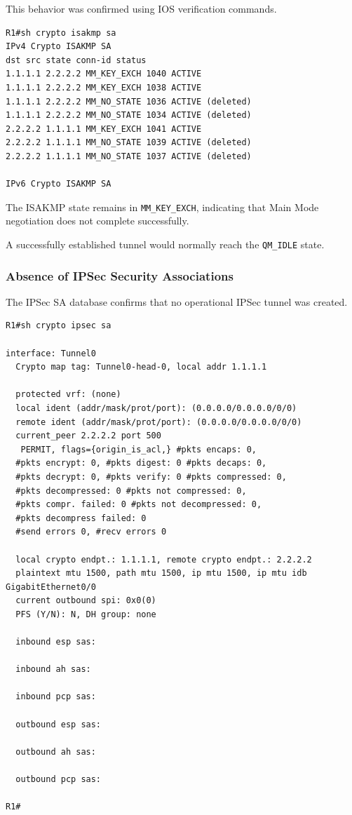 \documentclass[12pt]{article}
\begin{document}
This behavior was confirmed using IOS verification commands.

\begin{verbatim}
R1#sh crypto isakmp sa 
IPv4 Crypto ISAKMP SA 
dst src state conn-id status 
1.1.1.1 2.2.2.2 MM_KEY_EXCH 1040 ACTIVE 
1.1.1.1 2.2.2.2 MM_KEY_EXCH 1038 ACTIVE 
1.1.1.1 2.2.2.2 MM_NO_STATE 1036 ACTIVE (deleted) 
1.1.1.1 2.2.2.2 MM_NO_STATE 1034 ACTIVE (deleted) 
2.2.2.2 1.1.1.1 MM_KEY_EXCH 1041 ACTIVE 
2.2.2.2 1.1.1.1 MM_NO_STATE 1039 ACTIVE (deleted) 
2.2.2.2 1.1.1.1 MM_NO_STATE 1037 ACTIVE (deleted) 

IPv6 Crypto ISAKMP SA
\end{verbatim}

The ISAKMP state remains in \texttt{MM\_KEY\_EXCH}, indicating that Main Mode negotiation does not complete successfully.

A successfully established tunnel would normally reach the \texttt{QM\_IDLE} state.

\subsubsection{Absence of IPSec Security Associations}

The IPSec SA database confirms that no operational IPSec tunnel was created.

\begin{verbatim}
R1#sh crypto ipsec sa 

interface: Tunnel0 
  Crypto map tag: Tunnel0-head-0, local addr 1.1.1.1 
  
  protected vrf: (none) 
  local ident (addr/mask/prot/port): (0.0.0.0/0.0.0.0/0/0) 
  remote ident (addr/mask/prot/port): (0.0.0.0/0.0.0.0/0/0) 
  current_peer 2.2.2.2 port 500 
   PERMIT, flags={origin_is_acl,} #pkts encaps: 0, 
  #pkts encrypt: 0, #pkts digest: 0 #pkts decaps: 0, 
  #pkts decrypt: 0, #pkts verify: 0 #pkts compressed: 0, 
  #pkts decompressed: 0 #pkts not compressed: 0, 
  #pkts compr. failed: 0 #pkts not decompressed: 0, 
  #pkts decompress failed: 0 
  #send errors 0, #recv errors 0 
  
  local crypto endpt.: 1.1.1.1, remote crypto endpt.: 2.2.2.2 
  plaintext mtu 1500, path mtu 1500, ip mtu 1500, ip mtu idb 
GigabitEthernet0/0 
  current outbound spi: 0x0(0) 
  PFS (Y/N): N, DH group: none 
  
  inbound esp sas: 
  
  inbound ah sas: 
  
  inbound pcp sas: 
  
  outbound esp sas: 
  
  outbound ah sas: 
  
  outbound pcp sas: 
  
R1#
\end{verbatim}
\end{document}
